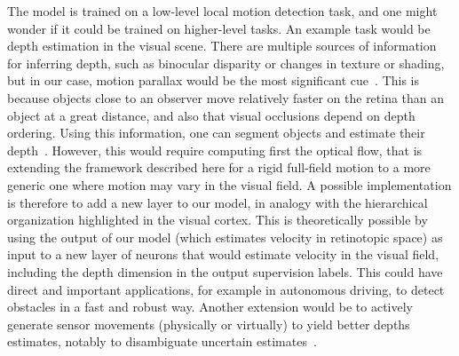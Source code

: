\documentclass[default]{sn-jnl}%
\theoremstyle{thmstyleone}%
\theoremstyle{thmstyletwo}%
\theoremstyle{thmstylethree}%
\begin{document}
The model is trained on a low-level local motion detection task, and one might wonder if it could be trained on higher-level tasks. An example task would be depth estimation in the visual scene. There are multiple sources of information for inferring depth, such as binocular disparity or changes in texture or shading, but in our case, motion parallax would be the most significant cue~\citep{rogers_motion_1979}. This is because objects close to an observer move relatively faster on the retina than an object at a great distance, and also that visual occlusions depend on depth ordering. Using this information, one can segment objects and estimate their depth~\citep{yoonessi_contribution_2011}. However, this would require computing first the optical flow, that is extending the framework described here for a rigid full-field motion to a more generic one where motion may vary in the visual field. A possible implementation is therefore to add a new layer to our model, in analogy with the hierarchical organization highlighted in the visual cortex. This is theoretically possible by using the output of our model (which estimates velocity in retinotopic space) as input to a new layer of neurons that would estimate velocity in the visual field, including the depth dimension in the output supervision labels. This could have direct and important applications, for example in autonomous driving, to detect obstacles in a fast and robust way. Another extension would be to actively generate sensor movements (physically or virtually) to yield better depths estimates, notably to disambiguate uncertain estimates~\citep{nawrot_eye_2003}.
\end{document}
